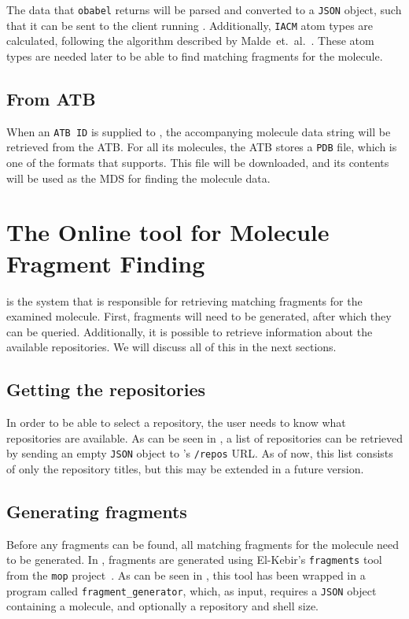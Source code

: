 The data that \verb|obabel| returns will be parsed and converted to a \verb|JSON| object, such that it can be sent to the client running \oframp. Additionally, \verb|IACM| atom types are calculated, following the algorithm described by Malde~et.~al.~\cite{malde2011automated}. These atom types are needed later to be able to find matching fragments for the molecule.


\subsection{From ATB}
When an \verb|ATB ID| is supplied to \oapoc, the accompanying molecule data string will be retrieved from the ATB. For all its molecules, the ATB stores a \verb|PDB| file, which is one of the formats that \oapoc{} supports. This file will be downloaded, and its contents will be used as the MDS for finding the molecule data.



\section[\omfraf]{The Online tool for Molecule Fragment Finding}
\omfraf{} is the system that is responsible for retrieving matching fragments for the examined molecule. First, fragments will need to be generated, after which they can be queried. Additionally, it is possible to retrieve information about the available repositories. We will discuss all of this in the next sections.


\subsection{Getting the repositories}
In order to be able to select a repository, the user needs to know what repositories are available. As can be seen in , a list of repositories can be retrieved by sending an empty \verb|JSON| object to \omfraf's \verb|/repos| URL. As of now, this list consists of only the repository titles, but this may be extended in a future version.


\subsection{Generating fragments}
Before any fragments can be found, all matching fragments for the molecule need to be generated. In \omfraf, fragments are generated using El-Kebir's \verb|fragments| tool from the \verb|mop| project~\cite{elkebir2014molecule}. As can be seen in , this tool has been wrapped in a program called \verb|fragment_generator|, which, as input, requires a \verb|JSON| object containing a molecule, and optionally a repository and shell size.

